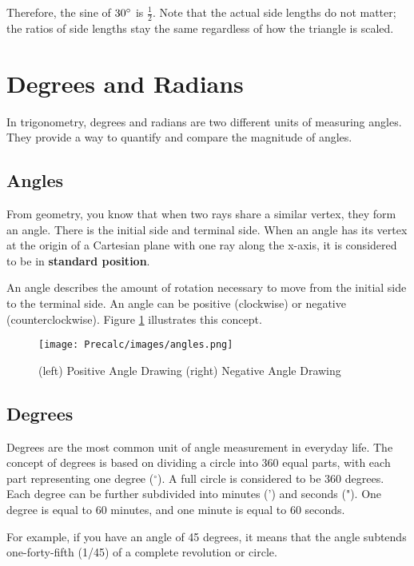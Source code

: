 \documentclass[11pt]{article}
\begin{document}
Therefore, the sine of $30\degree$ is $\frac{1}{2}$. Note that the actual side lengths do not matter; the ratios of side lengths stay the same regardless of how the triangle is scaled.


\section{Degrees and Radians}

 In trigonometry, degrees and radians are two different units of measuring angles. They provide a way to quantify and compare the magnitude of angles.

\subsection{Angles}

From geometry, you know that when two rays share a similar vertex, they form an angle. There is the initial side and terminal side. When an angle has its vertex at the origin of a Cartesian plane with one ray along the x-axis, it is considered to be in \textbf{standard position}.

An angle describes the amount of rotation necessary to move from the initial side to the terminal side. An angle can be positive (clockwise) or negative (counterclockwise). Figure \ref{fig:angles} illustrates this concept.

\begin{figure}[H]
    \centering
    \texttt{[image: Precalc/images/angles.png]}
    \caption{(left) Positive Angle Drawing (right) Negative Angle Drawing}
    \label{fig:angles}
\end{figure}

\subsection{Degrees}

Degrees are the most common unit of angle measurement in everyday life. The concept of degrees is based on dividing a circle into 360 equal parts, with each part representing one degree ($^\circ$). A full circle is considered to be 360 degrees. Each degree can be further subdivided into minutes (') and seconds ("). One degree is equal to 60 minutes, and one minute is equal to 60 seconds.

For example, if you have an angle of 45 degrees, it means that the angle subtends one-forty-fifth (1/45) of a complete revolution or circle.
\end{document}
